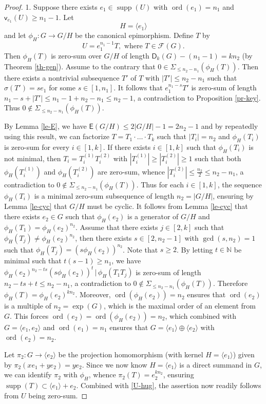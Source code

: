 \documentclass[11pt]{amsart}
\theoremstyle{definition}
\newcommand{\N}{\mathbb N}
\DeclareMathOperator{\ord}{ord}
\DeclareMathOperator{\supp}{supp}
\newcommand{\la}{\langle}
\newcommand{\ra}{\rangle}
\newcommand{\be}{\begin{equation}}
\newcommand{\ee}{\end{equation}}
\renewcommand{\t}{\, | \,}
\numberwithin{equation}{section}
\begin{document}
\begin{proof}			
	1.	Suppose there exists $e_1\in \supp(U)$ with $\ord(e_1)=n_1$ and $\mathsf v_{e_1}(U)\ge n_1-1$. 
		Let $$H=\la e_1\ra$$ and let $\phi_H:G\rightarrow G/H$ be the canonical epimorphism. 
		Define $T$ by \be\label{U-hug}U=e_1^{n_1-1} T, \text{ where }T\in \mathcal F(G).\ee
		Then $\phi_H(T)$ is zero-sum over $G/H$ of length $\mathsf D_k(G)-(n_1-1)=kn_2$ (by Theorem \ref{th-gen}).
		Assume to the contrary that $0\in \Sigma_{\le n_2-n_1}(\phi_H(T))$. Then there exists a nontrivial subsequence $T'$ of $T$ with $|T'|\le n_2-n_1$  such that $\sigma(T')=se_1$ for some $s\in [1,n_1]$.
		It follows that $e_1^{n_1-s}T'$ is zero-sum of length $n_1-s+|T'|\le n_1-1+n_2-n_1\le n_2-1$, a contradiction to Proposition \ref{pr-key}. Thus $0\not\in \Sigma_{\le n_2-n_1}(\phi_H(T))$.
		
		
		By Lemma \ref{le-E}, we have $\mathsf E(G/H)\le 2|G/H|-1=2n_2-1$ and by repeatedly using this result, we can factorize  $T=T_1\cdot\ldots\cdot T_k$ such that $|T_i|=n_2$ and $\phi_H(T_i)$ is zero-sum for every $i\in [1,k]$.
		If there exists $i\in [1,k]$ such that $\phi_H(T_i)$ is not minimal, then $T_i=T_i^{(1)}T_i^{(2)}$ with $|T_i^{(1)}|\ge |T_i^{(2)}|\ge 1$ such that both $\phi_H(T_i^{(1)})$ and $\phi_H(T_i^{(2)})$ are zero-sum, whence $|T_i^{(2)}|\le \frac{n_2}{2}\le n_2-n_1$, a contradiction to $0\not\in \Sigma_{\le n_2-n_1}(\phi_H(T))$.
		Thus for each $i\in [1,k]$, the sequence $\phi_H(T_i)$ is a minimal zero-sum subsequence of length $n_2=|G/H|$, ensuring by Lemma \ref{le-cyc} that $G/H$ must be cyclic.
		It follows from Lemma \ref{le-cyc} that there exists $e_2\in G$  such that  $\phi_H(e_2)$ is a generator of $G/H$ and $\phi_H(T_1)=\phi_H(e_2)^{n_2}$.
		Assume that there exists $j\in [2,k]$ such that $\phi_H(T_j)\neq \phi_H(e_2)^{n_2}$, then there exists $s\in [2, n_2-1]$ with $\gcd(s,n_2)=1$ such that $\phi_H(T_j)= (s\phi_H(e_2))^{n_2}$. Note that $s\ge 2$. By letting $t\in \N$ be minimal such that $t(s-1)\ge n_1$, we have $\phi_H(e_2)^{n_2-ts}(s\phi_H(e_2))^t\t \phi_H(T_1T_j)$ is zero-sum of length $n_2-ts+t\le n_2-n_1$, a contradiction to $0\not\in \Sigma_{\le n_2-n_1}(\phi_H(T))$. Therefore $\phi_H(T)=\phi_H(e_2)^{kn_2}$.
		Moreover, $\ord(\phi_H(e_2))=n_2$ ensures that $\ord(e_2)$ is a multiple of $n_2=\exp(G)$, which is the maximal order of an element from $G$. This forces $\ord(e_2)=\ord(\phi_H(e_2))=n_2$, which combined with $G=\la e_1,e_2\ra$ and $\ord(e_1)=n_1$ ensures that $G=\la e_1\ra\oplus \la e_2\ra$ with $\ord(e_2)=n_2$.
		
		
		Let $\pi_2:G\rightarrow \la e_2\ra$ be the projection homomorphism (with kernel $H=\la e_1\ra$) given by $\pi_2(xe_1+ye_2)=ye_2$. Since we now know $H=\la e_1\ra$ is a direct summand in $G$, we can identify $\pi_2$ with $\phi_H$, whence $\pi_2(T)=e_2^{kn_2}$, ensuring
		$\supp(T)\subset \la e_1\ra+e_2$. Combined with \eqref{U-hug}, the assertion now readily follows from  $U$ being zero-sum.
		

\end{proof}
\end{document}
